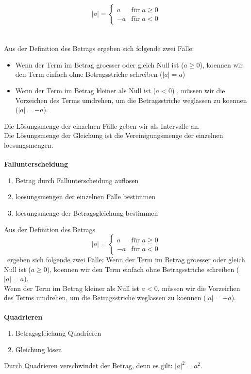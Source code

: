 \begin{multicols}{2}
    \begin{equation*} |a| = \begin{cases} a &\text{für } a \geq 0 \\[5px] -a &\text{für } a < 0 \end{cases} \end{equation*}\\~\\
    Aus der Definition des Betrags ergeben sich folgende zwei Fälle: \\
    \begin{itemize}
        \item Wenn der Term im Betrag groesser oder gleich Null ist ($a \geq 0$), koennen wir den Term einfach ohne Betragsstriche schreiben ($|a| = a$)
        \item Wenn der Term im Betrag kleiner als Null ist ($a < 0$) , müssen wir die Vorzeichen des Terms umdrehen, um die Betragsstriche weglassen zu koennen ($|a| = -a$).
    \end{itemize}
    Die Lösungsmenge der einzelnen Fälle geben wir als Intervalle an. \\
    Die Lösungsmenge der Gleichung ist die Vereinigungsmenge der einzelnen loesungsmengen.\\~\\
    \textbf{Fallunterscheidung}
    \begin{enumerate}
        \item Betrag durch Fallunterscheidung auflösen
        \item loesungsmengen der einzelnen Fälle bestimmen
        \item loesungsmenge der Betragsgleichung bestimmen
    \end{enumerate}
    Aus der Definition des Betrags
    \begin{equation*} |a| = \begin{cases} a &\text{für } a \geq 0 \\[5px] -a &\text{für } a < 0 \end{cases} \end{equation*}\
    ergeben sich folgende zwei Fälle:
    Wenn der Term im Betrag groesser oder gleich Null ist ($a \geq 0$), koennen wir den Term einfach ohne Betragsstriche schreiben ($|a| = a$). \\
    Wenn der Term im Betrag kleiner als Null ist $a < 0$, müssen wir die Vorzeichen des Terms umdrehen, um die Betragsstriche weglassen zu koennen ($|a| = -a$).\\~\\
    \textbf{Quadrieren}
    \begin{enumerate}
        \item Betragsgleichung Quadrieren
        \item Gleichung lösen
    \end{enumerate}
    Durch Quadrieren verschwindet der Betrag, denn es gilt: $|a|^2 = a^2$.



\end{multicols}
